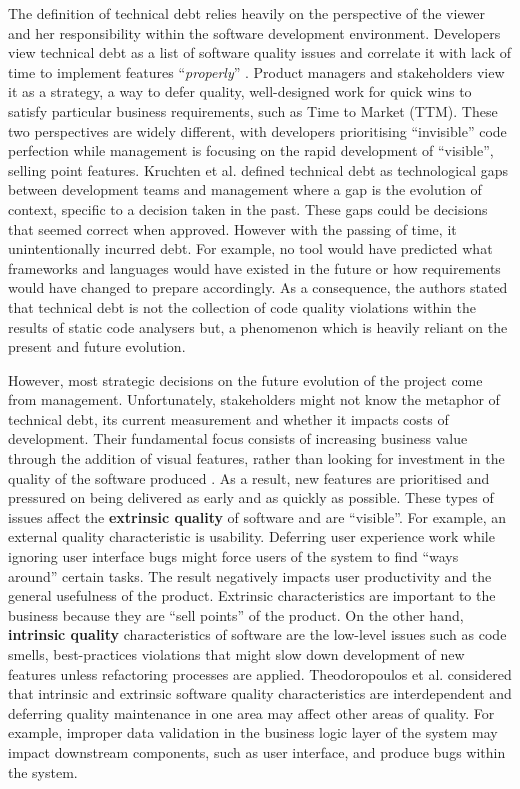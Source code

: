 \documentclass{mprop}
\begin{document}
The definition of technical debt relies heavily on the perspective of the viewer
and her responsibility within the software development environment. Developers
view technical debt as a list of software quality issues and correlate it with
lack of time to implement features ``\textit{properly}'' \cite{Codabux2013}.
Product managers and stakeholders view it as a strategy, a way to defer quality,
well-designed work for quick wins to satisfy particular business requirements,
such as Time to Market (TTM). These two perspectives are widely different, with
developers prioritising ``invisible'' code perfection while management is
focusing on the rapid development of ``visible'', selling point features.
Kruchten et al. \cite{Kruchten2012} defined technical debt as technological gaps
between development teams and management where a gap is the evolution of
context, specific to a decision taken in the past. These gaps could be decisions
that seemed correct when approved. However with the passing of time, it
unintentionally incurred debt. For example, no tool would have predicted what
frameworks and languages would have existed in the future or how requirements
would have changed to prepare accordingly. As a consequence, the authors stated
that technical debt is not the collection of code quality violations within the
results of static code analysers but, a phenomenon which is heavily reliant on
the present and future evolution.


However, most strategic decisions on the future evolution of the project come
from management. Unfortunately, stakeholders might not know the metaphor of
technical debt, its current measurement and whether it impacts costs of
development. Their fundamental focus consists of increasing business value
through the addition of visual features, rather than looking for investment in
the quality of the software produced \cite{Lim2012}. As a result, new features
are prioritised and pressured on being delivered as early and as quickly as
possible. These types of issues affect the \textbf{extrinsic quality} of
software and are ``visible''. For example, an external quality characteristic is
usability. Deferring user experience work while ignoring user interface bugs
might force users of the system to find ``ways around'' certain tasks. The result
negatively impacts user productivity and the general usefulness of the product.
Extrinsic characteristics are important to the business because they are ``sell
points'' of the product. On the other hand, \textbf{intrinsic quality}
characteristics of software are the low-level issues such as code smells,
best-practices violations that might slow down development of new features
unless refactoring processes are applied. Theodoropoulos et al.
\cite{Theodoropoulos2011} considered that intrinsic and extrinsic software
quality characteristics are interdependent and deferring quality maintenance in
one area may affect other areas of quality. For example, improper data
validation in the business logic layer of the system may impact downstream
components, such as user interface, and produce bugs within the system.
\end{document}
